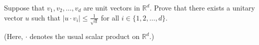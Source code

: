Suppose that \({{v_1},{v_2},\dots,{v_d}}\) are unit vectors in \({{\mathbb{R}^d}}\).  Prove that there exists a unitary vector \({u}\) such that \({\left| {u \cdot {v_i}} \right| \leq \frac{1}{{\sqrt d }}}\) for all \(i \in \{ 1,2,\dots,d\}\).

(Here, \({ \cdot }\) denotes the usual scalar product on \({{\mathbb{R}^d}}\).)


